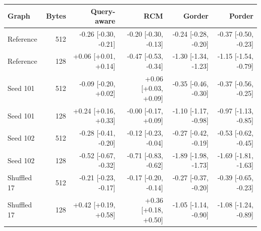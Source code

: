 \begin{tabular}{lrrrrr}
\toprule
Graph & Bytes & Query-aware & RCM & Gorder & Porder \\
\midrule
Reference & 512 & -0.26 [-0.30, -0.21] & -0.20 [-0.30, -0.13] & -0.24 [-0.28, -0.20] & -0.37 [-0.50, -0.23] \\
Reference & 128 & +0.06 [+0.01, +0.14] & -0.47 [-0.53, -0.34] & -1.30 [-1.34, -1.23] & -1.15 [-1.54, -0.79] \\
Seed 101 & 512 & -0.09 [-0.20, +0.02] & +0.06 [+0.03, +0.09] & -0.35 [-0.46, -0.30] & -0.37 [-0.56, -0.25] \\
Seed 101 & 128 & +0.24 [+0.16, +0.33] & -0.00 [-0.17, +0.09] & -1.10 [-1.17, -0.98] & -0.97 [-1.13, -0.85] \\
Seed 102 & 512 & -0.28 [-0.41, -0.20] & -0.12 [-0.23, -0.04] & -0.27 [-0.42, -0.19] & -0.53 [-0.62, -0.45] \\
Seed 102 & 128 & -0.52 [-0.67, -0.32] & -0.71 [-0.83, -0.62] & -1.89 [-1.98, -1.73] & -1.69 [-1.81, -1.63] \\
Shuffled 17 & 512 & -0.21 [-0.23, -0.17] & -0.17 [-0.20, -0.14] & -0.27 [-0.37, -0.20] & -0.39 [-0.65, -0.23] \\
Shuffled 17 & 128 & +0.42 [+0.19, +0.58] & +0.36 [+0.18, +0.50] & -1.05 [-1.14, -0.90] & -1.08 [-1.24, -0.89] \\
\bottomrule
\end{tabular}

